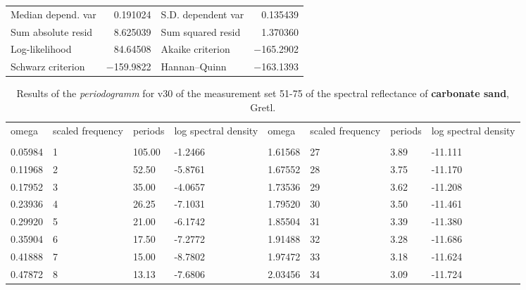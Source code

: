 \documentclass[10pt, a4paper]{article}
\begin{document}
\begin{appendices}
\begin{table}[H]
\begin{center}
\vspace{1ex}
\begin{tabular}{lrlr}
Median depend. var &  0.191024 & S.D. dependent var &  0.135439 \\
Sum absolute resid &  8.625039 & Sum squared resid &  1.370360 \\
Log-likelihood &  84.64508 & Akaike criterion & $-$165.2902 \\
Schwarz criterion & $-$159.9822 & Hannan--Quinn & $-$163.1393 \\ \hline \hline
\end{tabular}
\end{center}
\end{table}
\pagebreak

\begin{table}[H]
\begin{small}
\caption{Results of the \textit{periodogramm} for v30 of the measurement set 51-75 of the spectral reflectance of \textbf{carbonate sand}, Gretl.}
\label{tab:14}
\begin{center}
\begin{tabular}{|p{15mm} p{15mm} p{15mm} p{15mm} || p{15mm} p{15mm}p{15mm} p{15mm}|}
omega & scaled frequency & periods & log spectral density & omega & scaled frequency & periods & log spectral density \\ \\ \hline\hline
0.05984      & 1    &      105.00  &      -1.2466  &  1.61568   &   27    &        3.89     &    -11.111\\ 
 0.11968     &  2   &        52.50   &      -5.8761 &   1.67552   &   28    &        3.75     &    -11.170\\ 
 0.17952     &  3   &        35.00   &      -4.0657 &  1.73536   &   29    &        3.62     &    -11.208\\ 
 0.23936     &  4   &        26.25   &      -7.1031 &  1.79520   &   30    &        3.50     &    -11.461\\ 
 0.29920     &  5   &        21.00   &      -6.1742 &  1.85504   &   31    &        3.39     &    -11.380\\ 
 0.35904     &  6   &        17.50   &      -7.2772  & 1.91488    & 32     &       3.28      &   -11.686\\ 
 0.41888     &  7     &      15.00   &      -8.7802 &  1.97472    &  33    &        3.18     &    -11.624\\ 
 0.47872     &  8     &      13.13   &      -7.6806 & 2.03456    &  34    &        3.09         &-11.724\\ 

\end{tabular}
\end{center}
\end{small}
\end{table}
\end{appendices}
\end{document}
